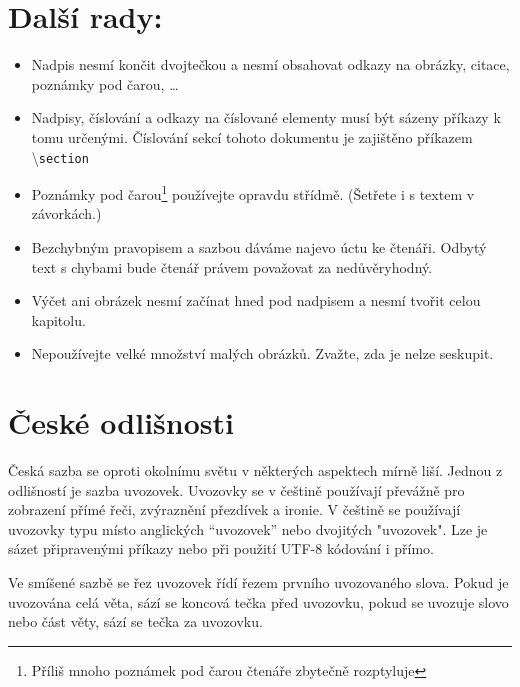 \documentclass[a4paper,twocolumn, 10pt]{article}
\begin{document}
\section{Další rady:}

\begin{itemize}
\item Nadpis nesmí končit dvojtečkou a nesmí obsahovat
odkazy na obrázky, citace, poznámky pod čarou, \dots 

\item Nadpisy, číslování a odkazy na číslované elementy
musí být sázeny příkazy k tomu určenými. Číslování sekcí tohoto dokumentu je zajištěno příkazem \textbackslash \texttt{section}

\newpage
\item Poznámky pod čarou\footnote{Příliš mnoho poznámek pod čarou čtenáře zbytečně rozptyluje} používejte opravdu střídmě.
(Šetřete i s textem v závorkách.)

\item Bezchybným pravopisem a sazbou dáváme najevo
úctu ke čtenáři. Odbytý text s chybami bude čtenář
právem považovat za nedůvěryhodný.

\item Výčet ani obrázek nesmí začínat hned pod nadpisem
a nesmí tvořit celou kapitolu.

\item Nepoužívejte velké množství malých obrázků. Zvažte,
zda je nelze seskupit.

\end{itemize}

\section{České odlišnosti}

\maketitle
Česká sazba se oproti okolnímu světu v některých aspektech mírně liší. Jednou z odlišností je sazba uvozovek. Uvozovky se v češtině používají převážně pro zobrazení přímé řeči, zvýraznění přezdívek a ironie. V češtině se používají uvozovky typu  místo anglických “uvozovek” nebo dvojitých "uvozovek". Lze je sázet připravenými příkazy nebo při použití UTF-8 kódování i přímo.

Ve smíšené sazbě se řez uvozovek řídí řezem prvního
uvozovaného slova. Pokud je uvozována celá věta, sází se
koncová tečka před uvozovku, pokud se uvozuje slovo nebo
část věty, sází se tečka za uvozovku.
\end{document}
